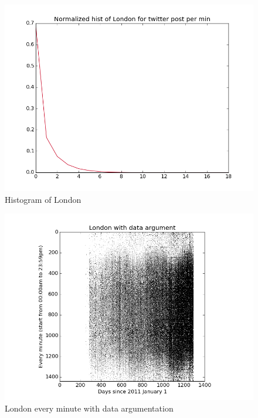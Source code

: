 \documentclass[a4paper,12pt]{article}
\begin{document}
\begin{figure}[H]
  \begin{center}
      \includegraphics[scale=0.8]{Londonhisto.png}
\end{center}
\caption{Histogram of London}
 \label {fig:2}
 \end{figure}

\begin{figure}[H]
  \begin{center}
      \includegraphics[scale=0.8]{Londonbinary.png}
\end{center}
\caption{London every minute with data argumentation}
 \label {fig:2}
 \end{figure}
\end{document}
